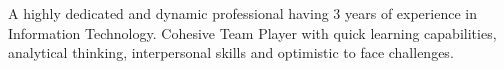 

\begin{cvparagraph}
A highly dedicated and dynamic professional having 3 years of experience in Information Technology. Cohesive Team Player with quick learning capabilities, analytical thinking, interpersonal skills and optimistic to face challenges.
\end{cvparagraph}
